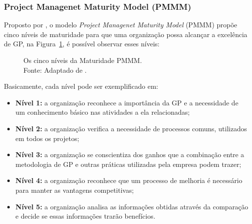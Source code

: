  \subsubsection{Project Managenet Maturity Model (PMMM)}

    Proposto por , o modelo \textit{Project Managenet Maturity Model} (PMMM) propõe cinco níveis de maturidade para que uma organização possa alcançar a excelência de GP, na Figura~\ref{pmmm}, é possível observar esses níveis:

    \begin{figure}[!h]
      \centering
      \caption{Os cinco níveis da Maturidade PMMM.\\ Fonte: Adaptado de \cite{kerzner2006projeto}.}
      \label{pmmm}
    \end{figure}

    Basicamente, cada nível pode ser exemplificado em:

    \begin{itemize}
      \item \textbf{Nível 1:} a organização reconhece a importância da GP e a necessidade de um conhecimento básico nas atividades a ela relacionadas;
      \item \textbf{Nível 2:} a organização verifica a necessidade de processos comuns, utilizados em todos os projetos;
      \item \textbf{Nível 3:} a organização se conscientiza dos ganhos que a combinação entre a metodologia de GP e outras práticas utilizadas pela empresa podem trazer;
      \item \textbf{Nível 4:} a organização reconhece que um processo de melhoria é necessário para manter as vantagens competitivas;
      \item \textbf{Nível 5:} a organização analisa as informações obtidas através da comparação e decide se essas informações trarão benefícios.
    \end{itemize}

